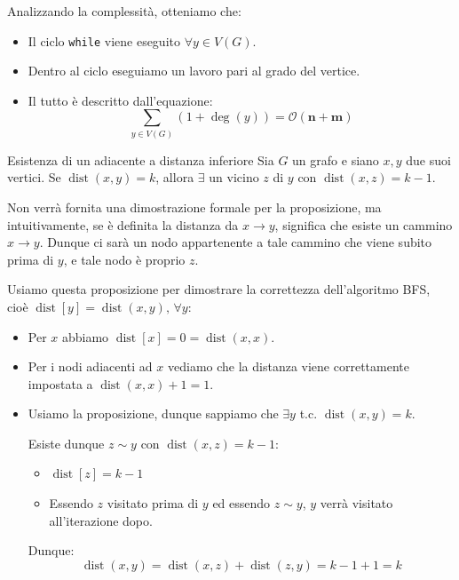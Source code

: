 \documentclass[12pt]{report}
\begin{document}
	Analizzando la complessità, otteniamo che:
	\begin{itemize}
		\item Il ciclo \texttt{while} viene eseguito $\forall y \in V(G)$.
		\item Dentro al ciclo eseguiamo un lavoro pari al grado del vertice.
		\item Il tutto è descritto dall'equazione:
		\[
		\sum_{y \in V(G)} (1 + \operatorname{deg}(y)) = \mathbf{\mathcal{O}(n + m)}
		\]
	\end{itemize}
	
	\begin{proposizione}{Esistenza di un adiacente a distanza inferiore}{}
		Sia $G$ un grafo e siano $x, y$ due suoi vertici. Se $\operatorname{dist}(x, y) = k$, allora $\exists$ un vicino $z$ di $y$ con $\operatorname{dist}(x, z) = k - 1$.
	\end{proposizione}
	
	
	Non verrà fornita una dimostrazione formale per la proposizione, ma intuitivamente, se è definita la distanza da $x \to y$, significa che esiste un cammino $x \to y$. Dunque ci sarà un nodo appartenente a tale cammino che viene subito prima di $y$, e tale nodo è proprio $z$.
	
	Usiamo questa proposizione per dimostrare la correttezza dell'algoritmo BFS, cioè $\operatorname{dist}[y] = \operatorname{dist}(x, y),\, \forall y$:
	
	\begin{itemize}
		\item Per $x$ abbiamo $\operatorname{dist}[x] = 0 = \operatorname{dist}(x, x)$.
		
		\item Per i nodi adiacenti ad $x$ vediamo che la distanza viene correttamente impostata a $\operatorname{dist}(x, x) + 1 = 1$.
		
		\item Usiamo la proposizione, dunque sappiamo che $\exists y$ t.c. $\operatorname{dist}(x, y) = k$.
		
		Esiste dunque $z \sim y$ con $\operatorname{dist}(x, z) = k - 1$:
		\begin{itemize}
			\item[$\implies$] $\operatorname{dist}[z] = k - 1$
			\item[$\implies$] Essendo $z$ visitato prima di $y$ ed essendo $z \sim y$, $y$ verrà visitato all'iterazione dopo.
		\end{itemize}
		Dunque:
		\[
		\operatorname{dist}(x, y) = \operatorname{dist}(x, z) + \operatorname{dist}(z, y) = k - 1 + 1 = k
		\]
	\end{itemize}
	
\end{document}
